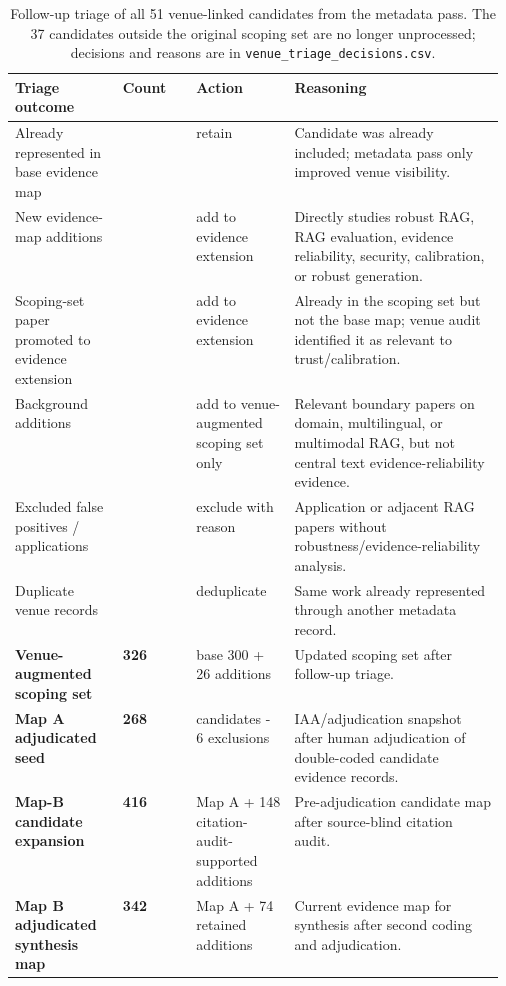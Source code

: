 \begin{table}[t]
\centering
\scriptsize
\renewcommand{\arraystretch}{0.94}
\begin{tabularx}{\linewidth}{>{\raggedright\arraybackslash}p{0.22\linewidth}>{\raggedright\arraybackslash}p{0.15\linewidth}>{\raggedright\arraybackslash}p{0.20\linewidth}X}
\toprule
\textbf{Triage outcome} & \textbf{Count} & \textbf{Action} & \textbf{Reasoning} \\
\midrule
Already represented in base evidence map & 13 & retain & Candidate was already included; metadata pass only improved venue visibility. \\
New evidence-map additions & 23 & add to evidence extension & Directly studies robust RAG, RAG evaluation, evidence reliability, security, calibration, or robust generation. \\
Scoping-set paper promoted to evidence extension & 1 & add to evidence extension & Already in the scoping set but not the base map; venue audit identified it as relevant to trust/calibration. \\
Background additions & 3 & add to venue-augmented scoping set only & Relevant boundary papers on domain, multilingual, or multimodal RAG, but not central text evidence-reliability evidence. \\
Excluded false positives / applications & 9 & exclude with reason & Application or adjacent RAG papers without robustness/evidence-reliability analysis. \\
Duplicate venue records & 2 & deduplicate & Same work already represented through another metadata record. \\
\midrule
\textbf{Venue-augmented scoping set} & \textbf{326} & base 300 + 26 additions & Updated scoping set after follow-up triage. \\
\textbf{Map A adjudicated seed} & \textbf{268} & 274 candidates - 6 exclusions & IAA/adjudication snapshot after human adjudication of double-coded candidate evidence records. \\
\textbf{Map-B candidate expansion} & \textbf{416} & Map A + 148 citation-audit-supported additions & Pre-adjudication candidate map after source-blind citation audit. \\
\textbf{Map B adjudicated synthesis map} & \textbf{342} & Map A + 74 retained additions & Current evidence map for synthesis after second coding and adjudication. \\
\bottomrule
\end{tabularx}
\caption{Follow-up triage of all 51 venue-linked candidates from the metadata pass. The 37 candidates outside the original scoping set are no longer unprocessed; decisions and reasons are in \texttt{venue\_triage\_decisions.csv}.}
\label{tab:venue-triage-summary}
\end{table}
